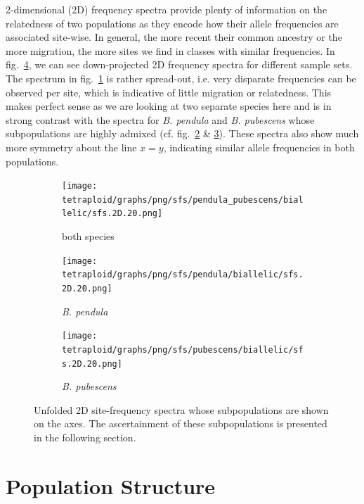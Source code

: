 \documentclass[hidelinks,11pt]{article}
\newcommand{\pendula}{\textit{B. pendula}}
\newcommand{\pubescens}{\textit{B. pubescens}}
\begin{document}
{    2-dimensional (2D) frequency spectra provide plenty of information on the relatedness of two populations as they encode how their allele frequencies are associated site-wise. In general, the more recent their common ancestry or the more migration, the more sites we find in classes with similar frequencies. In fig.~\ref{fig:sfs_2d}, we can see down-projected 2D frequency spectra for different sample sets. The spectrum in fig.~\ref{fig:sfs_2d_pendula_pubescens} is rather spread-out, i.e. very disparate frequencies can be observed per site, which is indicative of little migration or relatedness. This makes perfect sense as we are looking at two separate species here and is in strong contrast with the spectra for \pendula{} and \pubescens{} whose subpopulations are highly admixed (cf. fig.~\ref{fig:sfs_2d_pendula} \& \ref{fig:sfs_2d_pubescens}). These spectra also show much more symmetry about the line $x=y$, indicating similar allele frequencies in both populations.

    \begin{figure}[ht]
        \centering
        \begin{subfigure}[b]{0.32\textwidth}
            \centering
            \texttt{[image: tetraploid/graphs/png/sfs/pendula\_pubescens/biallelic/sfs.2D.20.png]}
            \caption{both species}
            \label{fig:sfs_2d_pendula_pubescens}
        \end{subfigure}
        \hfill
        \begin{subfigure}[b]{0.32\textwidth}
            \centering
            \texttt{[image: tetraploid/graphs/png/sfs/pendula/biallelic/sfs.2D.20.png]}
            \caption{\pendula{}}
            \label{fig:sfs_2d_pendula}
        \end{subfigure}
        \hfill
        \begin{subfigure}[b]{0.32\textwidth}
            \centering
            \texttt{[image: tetraploid/graphs/png/sfs/pubescens/biallelic/sfs.2D.20.png]}
            \caption{\pubescens{}}
            \label{fig:sfs_2d_pubescens}
        \end{subfigure}
        \caption{Unfolded 2D site-frequency spectra whose subpopulations are shown on the axes. The ascertainment of these subpopulations is presented in the following section.}
        \label{fig:sfs_2d}
    \end{figure}

    \clearpage


    \section{Population Structure}
    \label{sec:population-structure}

}
\end{document}
